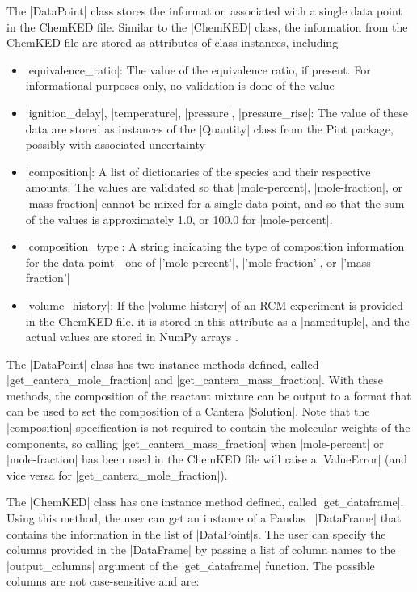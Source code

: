 \documentclass[12pt]{ussci}
\newcommand\ck{ChemKED}
\begin{document}
The \python|DataPoint| class stores the information associated with a single
data point in the \ck{} file. Similar to the \python|ChemKED| class, the
information from the \ck{} file are stored as attributes of class instances,
including
%
\begin{itemize}
    \item \python|equivalence_ratio|: The value of the equivalence ratio, if
    present. For informational purposes only, no validation is done of the value
    \item \python|ignition_delay|, \python|temperature|, \python|pressure|,
    \python|pressure_rise|: The value of these data are stored as instances of
    the \python|Quantity| class from the Pint \autocite{Grecco2016} package,
    possibly with associated uncertainty
    \item \python|composition|: A list of dictionaries of the species and their
    respective amounts. The values are validated so that \yaml|mole-percent|,
    \yaml|mole-fraction|, or \yaml|mass-fraction| cannot be mixed for a single
    data point, and so that the sum of the values is approximately 1.0, or
    100.0 for \yaml|mole-percent|.
    \item \python|composition_type|: A string indicating the type of composition
    information for the data point---one of \python|'mole-percent'|,
    \python|'mole-fraction'|, or \python|'mass-fraction'|
    \item \python|volume_history|: If the \yaml|volume-history| of an RCM
    experiment is provided in the \ck{} file, it is stored in this attribute as
    a \python|namedtuple|, and the actual values are stored in NumPy arrays
    \autocite{vanderWalt:2011np}.
\end{itemize}

The \python|DataPoint| class has two instance methods defined, called
\python|get_cantera_mole_fraction| and \python|get_cantera_mass_fraction|. With
these methods, the composition of the reactant mixture can be output to a format
that can be used to set the composition of a Cantera \python|Solution|. Note
that the \python|composition| specification is not required to contain the
molecular weights of the components, so calling
\python|get_cantera_mass_fraction| when \yaml|mole-percent| or
\yaml|mole-fraction| has been used in the \ck{} file will raise a
\python|ValueError| (and vice versa for \python|get_cantera_mole_fraction|).

The \python|ChemKED| class has one instance method defined, called
\python|get_dataframe|. Using this method, the user can get an instance of a
Pandas~\autocite{pandas} \python|DataFrame| that contains the information in the
list of \python|DataPoint|s. The user can specify the columns provided in the
\python|DataFrame| by passing a list of column names to the
\python|output_columns| argument of the \python|get_dataframe| function. The
possible columns are not case-sensitive and are:
\end{document}

